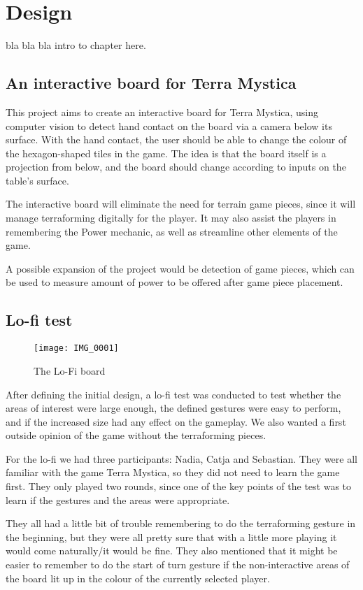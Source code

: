 \chapter{Design}\label{ch:design}
bla bla bla intro to chapter here.

\section{An interactive board for Terra Mystica}
This project aims to create an interactive board for Terra Mystica, using computer vision to detect hand contact on the board via a camera below its surface. With the hand contact, the user should be able to change the colour of the hexagon-shaped tiles in the game. The idea is that the board itself is a projection from below, and the board should change according to inputs on the table's surface.

The interactive board will eliminate the need for terrain game pieces, since it will manage terraforming digitally for the player. It may also assist the players in remembering the Power mechanic, as well as streamline other elements of the game.

A possible expansion of the project would be detection of game pieces, which can be used to measure amount of power to be offered after game piece placement.

\section{Lo-fi test}
\begin{figure}
\centering
\texttt{[image: IMG\_0001]}
\caption{The Lo-Fi board}
\end{figure}

After defining the initial design, a lo-fi test was conducted to test whether the areas of interest were large enough, the defined gestures were easy to perform, and if the increased size had any effect on the gameplay. We also wanted a first outside opinion of the game without the terraforming pieces. 

For the lo-fi we had three participants: Nadia, Catja and Sebastian.  
They were all familiar with the game Terra Mystica, so they did not need to learn the game first. They only played two rounds, since one of the key points of the test was to learn if the gestures and the areas were appropriate. 

They all had a little bit of trouble remembering to do the terraforming gesture in the beginning, but they were all pretty sure that with a little more playing it would come naturally/it would be fine. They also mentioned that it might be easier to remember to do the start of turn gesture if the non-interactive areas of the board lit up in the colour of the currently selected player. 

